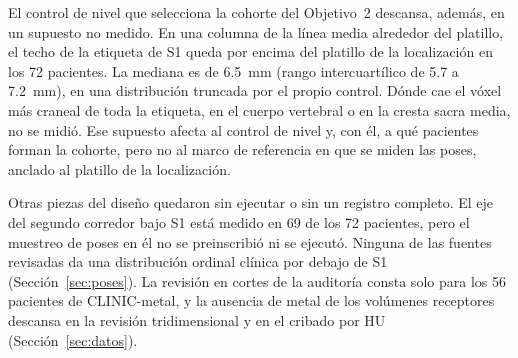 El control de nivel que selecciona la cohorte del Objetivo~2 descansa, además, en un supuesto no medido. En una columna de la línea media alrededor del platillo, el techo de la etiqueta de S1 queda por encima del platillo de la localización en los 72 pacientes. La mediana es de 6.5~mm (rango intercuartílico de 5.7 a 7.2~mm), en una distribución truncada por el propio control. Dónde cae el vóxel más craneal de toda la etiqueta, en el cuerpo vertebral o en la cresta sacra media, no se midió. Ese supuesto afecta al control de nivel y, con él, a qué pacientes forman la cohorte, pero no al marco de referencia en que se miden las poses, anclado al platillo de la localización.

Otras piezas del diseño quedaron sin ejecutar o sin un registro completo. El eje del segundo corredor bajo S1 está medido en 69 de los 72 pacientes, pero el muestreo de poses en él no se preinscribió ni se ejecutó. Ninguna de las fuentes revisadas da una distribución ordinal clínica por debajo de S1 (Sección~\ref{sec:poses}). La revisión en cortes de la auditoría consta solo para los 56 pacientes de CLINIC-metal, y la ausencia de metal de los volúmenes receptores descansa en la revisión tridimensional y en el cribado por HU (Sección~\ref{sec:datos}).

